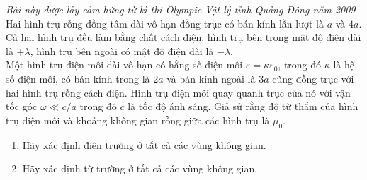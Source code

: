 \begin{vd}%
\textit{Bài này được lấy cảm hứng từ kì thi Olympic Vật lý tỉnh Quảng Đông năm 2009}\\
Hai hình trụ rỗng đồng tâm dài vô hạn đồng trục có bán kính lần lượt là $a$ và $4a$. Cả hai hình trụ đều làm bằng chất cách điện, hình trụ bên trong mật độ điện dài là $+\lambda$, hình trụ bên ngoài có mật độ điện dài là $-\lambda$.\\
Một hình trụ điện môi dài vô hạn có hằng số điện môi $\varepsilon=\kappa\varepsilon_0$, trong đó $\kappa$ là hệ số điện môi, có bán kính trong là $2a$ và bán kính ngoài là $3a$ cũng đồng trục với hai hình trụ rỗng cách điện. Hình trụ điện môi quay quanh trục của nó với vận tốc góc $\omega\ll c/a$ trong đó $c$ là tốc độ ánh sáng. Giả sử rằng độ từ thẩm của hình trụ điện môi và khoảng không gian rỗng giữa các hình trụ là $\mu_0$.
\begin{enumerate}[1)]
    \item Hãy xác định điện trường ở tất cả các vùng không gian.
    \item Hãy xác định từ trường ở tất cả các vùng không gian.
\end{enumerate}
\end{vd}
